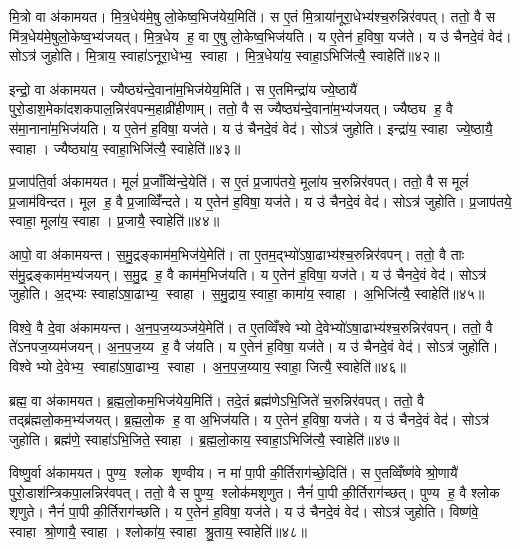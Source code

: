 मि॒त्रो वा अ॑कामयत। मि॒त्र॒धेय॑मे॒षु लो॒केष्व॒भिज॑येय॒मिति॑। स ए॒तं मि॒त्राया॑नूरा॒धेभ्य॑श्च॒रुन्निर॑वपत्। ततो॒ वै स मि॑त्र॒धेय॑मे॒षुलो॒केष्व॒भ्य॑जयत्। मि॒त्र॒धेय ह॒ वा ए॒षु लो॒केष्व॒भिज॑यति। य ए॒तेन॑ ह॒विषा॒ यज॑ते। य उ॑ चैनदे॒वं वेद॑। सोऽत्र॑ जुहोति। मि॒त्राय॒ स्वाहा॑ऽनूरा॒धेभ्य॒ स्वाहा। मि॒त्र॒धेया॑य॒ स्वाहा॒ऽभिजि॑त्यै॒ स्वाहेति॑॥४२॥

इन्द्रो॒ वा अ॑कामयत। ज्यैष्ठ्य॑न्दे॒वाना॑म॒भिज॑येय॒मिति॑। स ए॒तमिन्द्रा॑य ज्ये॒ष्ठायै॑ पुरो॒डाश॒मेका॑दशकपाल॒न्निर॑वपन्म॒हाव्री॑हीणाम्। ततो॒ वै स ज्यैष्ठ्य॑न्दे॒वाना॑म॒भ्य॑जयत्। ज्यैष्ठ्य ह॒ वै स॑मा॒नाना॑म॒भिज॑यति। य ए॒तेन॑ ह॒विषा॒ यज॑ते। य उ॑ चैनदे॒वं वेद॑। सोऽत्र॑ जुहोति। इन्द्रा॑य॒ स्वाहा ज्ये॒ष्ठायै॒ स्वाहा। ज्यैष्ठ्या॑य॒ स्वाहा॒भिजि॑त्यै॒ स्वाहेति॑॥४३॥

प्र॒जाप॑ति॒र्वा अ॑कामयत। मूलं॑ प्र॒जाँव्वि॑न्दे॒येति॑। स ए॒तं प्र॒जाप॑तये॒ मूला॑य च॒रुन्निर॑वपत्। ततो॒ वै स मूलं॑ प्र॒जाम॑विन्दत। मूल ह॒ वै प्र॒जाव्विँ॑न्दते। य ए॒तेन॑ ह॒विषा॒ यज॑ते। य उ॑ चैनदे॒वं वेद॑। सोऽत्र॑ जुहोति। प्र॒जाप॑तये॒ स्वाहा॒ मूला॑य॒ स्वाहा। प्र॒जायै॒ स्वाहेति॑॥४४॥

आपो॒ वा अ॑कामयन्त। स॒मु॒द्रङ्काम॑म॒भिज॑ये॒मेति॑। ता ए॒तम॒द्भ्यो॑ऽषा॒ढाभ्य॑श्च॒रुन्निर॑वपन्। ततो॒ वै ताः स॑मु॒द्रङ्काम॑म॒भ्य॑जयन्। स॒मु॒द्र ह॒ वै काम॑म॒भिज॑यति। य ए॒तेन॑ ह॒विषा॒ यज॑ते। य उ॑ चैनदे॒वं वेद॑। सोऽत्र॑ जुहोति। अ॒द्भ्यः स्वाहा॑ऽषा॒ढाभ्य॒ स्वाहा। स॒मु॒द्राय॒ स्वाहा॒ कामा॑य॒ स्वाहा। अ॒भिजि॑त्यै॒ स्वाहेति॑॥४५॥

विश्वे॒ वै दे॒वा अ॑कामयन्त। अ॒न॒प॒ज॒य्यञ्ज॑ये॒मेति॑। त ए॒तव्विँश्वेभ्यो दे॒वेभ्यो॑ऽषा॒ढाभ्य॑श्च॒रुन्निर॑वपन्। ततो॒ वै ते॑ऽनपज॒य्यम॑जयन्। अ॒न॒प॒ज॒य्य ह॒ वै ज॑यति। य ए॒तेन॑ ह॒विषा॒ यज॑ते। य उ॑ चैनदे॒वं वेद॑। सोऽत्र॑ जुहोति। विश्वेभ्यो दे॒वेभ्य॒ स्वाहा॑ऽषा॒ढाभ्य॒ स्वाहा। अ॒न॒प॒ज॒य्याय॒ स्वाहा॒ जित्यै॒ स्वाहेति॑॥४६॥

ब्रह्म॒ वा अ॑कामयत। ब्र॒ह्म॒लो॒कम॒भिज॑येय॒मिति॑। तदे॒तं ब्रह्म॑णेऽभि॒जिते॑ च॒रुन्निर॑वपत्। ततो॒ वै तद्ब्र॑ह्मलो॒कम॒भ्य॑जयत्। ब्र॒ह्म॒लो॒क ह॒ वा अ॒भिज॑यति। य ए॒तेन॑ ह॒विषा॒ यज॑ते। य उ॑ चैनदे॒वं वेद॑। सोऽत्र॑ जुहोति। ब्रह्म॑णे॒ स्वाहा॑ऽभि॒जिते॒ स्वाहा। ब्र॒ह्म॒लो॒काय॒ स्वाहा॒ऽभिजि॑त्यै॒ स्वाहेति॑॥४७॥

विष्णु॒र्वा अ॑कामयत। पुण्य॒ श्लोक शृण्वीय। न मा॑ पा॒पी की॒र्तिराग॑च्छे॒दिति॑। स ए॒तव्विँष्ण॑वे श्रो॒णायै॑ पुरो॒डाश॑न्त्रिकपा॒लन्निर॑वपत्। ततो॒ वै स पुण्य॒ श्लोक॑मशृणुत। नैनं॑ पा॒पी की॒र्तिराग॑च्छत्। पुण्य ह॒ वै श्लोक शृणुते। नैनं॑ पा॒पी की॒र्तिराग॑च्छति। य ए॒तेन॑ ह॒विषा॒ यज॑ते। य उ॑ चैनदे॒वं वेद॑। सोऽत्र॑ जुहोति। विष्ण॑वे॒ स्वाहा श्रो॒णायै॒ स्वाहा। श्लोका॑य॒ स्वाहा श्रु॒ताय॒ स्वाहेति॑॥४८॥

